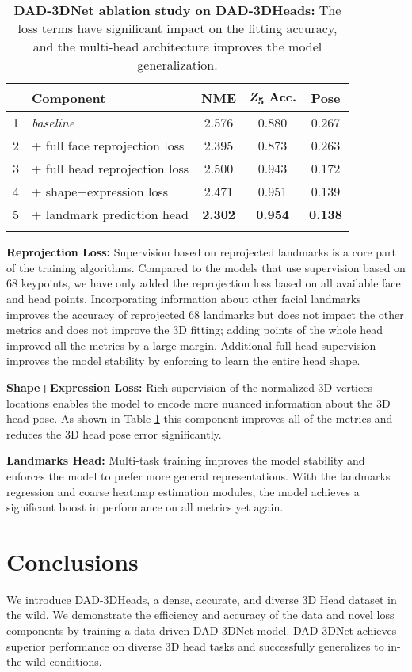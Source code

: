 \documentclass[10pt,twocolumn,letterpaper]{article}
\begin{document}
\begin{table}[h!]
\footnotesize
\renewcommand{\arraystretch}{0.95}
\centering
\begin{tabular}{r|l|ccc}
\noalign{\smallskip}
 & \textbf{Component} & \textbf{NME}{} & {\textbf{\textit{Z}\textsubscript{5}} \textbf{Acc.}{}} & \textbf{Pose}{}\\
\hline
1 & \textit{baseline} & 2.576 & 0.880 & 0.267\\
2 & + full face reprojection loss & 2.395 & 0.873 & 0.263\\
3 & + full head reprojection loss & 2.500 & 0.943 & 0.172\\
4 & + shape+expression loss & 2.471 & 0.951 & 0.139 \\
5 & + landmark prediction head & \textbf{2.302} & \textbf{0.954} & \textbf{0.138} \\
\noalign{\smallskip}
\end{tabular}
\caption{ \textbf{DAD-3DNet ablation study on DAD-3DHeads:} 
The loss terms have significant impact on the fitting accuracy, and the multi-head architecture improves the model generalization.}
\label{t:ablation}
\end{table} 
\textbf{Reprojection Loss:} Supervision based on reprojected landmarks is a core part of the training algorithms. Compared to the models that use supervision based on 68 keypoints, we have only added the reprojection loss based on all available face and head points. Incorporating information about other facial landmarks improves the accuracy of reprojected 68 landmarks but does not impact the other metrics and does not improve the 3D fitting; adding points of  the whole head improved all the metrics by a large margin. Additional full head supervision improves the model stability by enforcing to learn the entire head shape.

\textbf{Shape+Expression Loss:} Rich supervision of the normalized 3D vertices locations enables the model to encode more nuanced information about the 3D head pose. As shown in Table \ref{t:ablation} this component improves all of the metrics and reduces the 3D head pose error significantly.

\textbf{Landmarks Head:} Multi-task training improves the model stability and enforces the model to prefer more general representations. With the landmarks regression and coarse heatmap estimation modules, the model achieves a significant boost in performance on all metrics yet again.
 \section{Conclusions}
We introduce DAD-3DHeads, a dense, accurate, and diverse 3D Head dataset in the wild. We demonstrate the efficiency and accuracy of the data and novel loss components by training a data-driven DAD-3DNet model. DAD-3DNet achieves superior performance on diverse 3D head tasks and successfully generalizes to in-the-wild conditions. 
\end{document}
